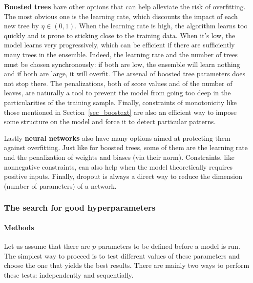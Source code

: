 \textbf{Boosted trees} have other options that can help alleviate the risk of overfitting. The most obvious one is the learning rate, which discounts the impact of each new tree by $\eta \in (0,1)$. When the learning rate is high, the algorithm learns too quickly and is prone to sticking close to the training data. When it's low, the model learns very progressively, which can be efficient if there are sufficiently many trees in the ensemble. Indeed, the learning rate and the number of trees must be chosen synchronously: if both are low, the ensemble will learn nothing and if both are large, it will overfit. The arsenal of boosted tree parameters does not stop there. The penalizations, both of score values and of the number of leaves, are naturally a tool to prevent the model from going too deep in the particularities of the training sample. Finally, constraints of monotonicity like those mentioned in Section~\ref{sec_boostext} are also an efficient way to impose some structure on the model and force it to detect particular patterns.

Lastly \textbf{neural networks} also have many options aimed at protecting them against overfitting. Just like for boosted trees, some of them are the learning rate and the penalization of weights and biases (via their norm). Constraints, like nonnegative constraints, can also help when the model theoretically requires positive inputs. Finally, dropout is always a direct way to reduce the dimension (number of parameters) of a network.

\subsubsection{The search for good hyperparameters}

\paragraph{Methods}

Let us assume that there are $p$ parameters to be defined before a model is run. The simplest way to proceed is to test different values of these parameters and choose the one that yields the best results. There are mainly two ways to perform these tests: independently and sequentially.


